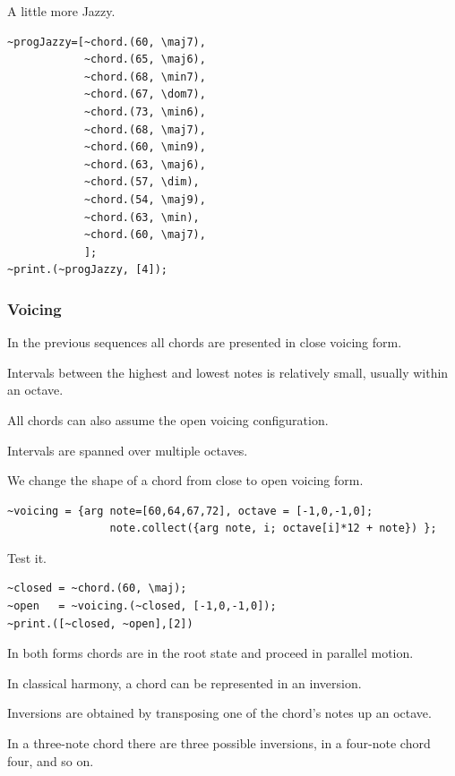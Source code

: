 A little more Jazzy.

\begin{lstlisting}[frame=single] 
~progJazzy=[~chord.(60, \maj7),
            ~chord.(65, \maj6),
            ~chord.(68, \min7),
            ~chord.(67, \dom7),
            ~chord.(73, \min6),
            ~chord.(68, \maj7),
            ~chord.(60, \min9),
            ~chord.(63, \maj6),
            ~chord.(57, \dim),
            ~chord.(54, \maj9),
            ~chord.(63, \min),        
            ~chord.(60, \maj7),
            ];              
~print.(~progJazzy, [4]);
\end{lstlisting}

\subsubsection{Voicing}\label{voicing}

In the previous sequences all chords are presented in close voicing form.

Intervals between the highest and lowest notes is relatively small, usually within an octave.

All chords can also assume the open voicing configuration.

Intervals are spanned over multiple octaves.

We change the shape of a chord from close to open voicing form.

\begin{lstlisting}[frame=single, caption=voicing model function] 
~voicing = {arg note=[60,64,67,72], octave = [-1,0,-1,0];
                note.collect({arg note, i; octave[i]*12 + note}) };
\end{lstlisting}

Test it.

\begin{lstlisting}[frame=single] 
~closed = ~chord.(60, \maj);                 
~open   = ~voicing.(~closed, [-1,0,-1,0]); 
~print.([~closed, ~open],[2])
\end{lstlisting}

In both forms chords are in the root state and proceed in parallel motion.

In classical harmony, a chord can be represented in an inversion.

Inversions are obtained by transposing one of the chord's notes up an octave.

In a three-note chord there are three possible inversions, in a four-note chord four, and so on.

